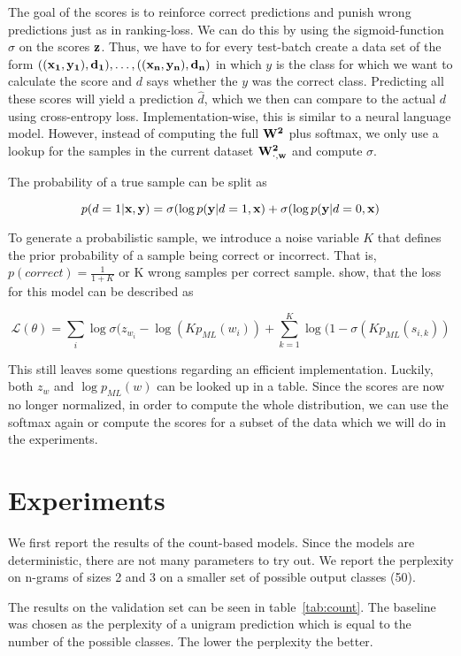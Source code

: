 \documentclass[11pt]{article}
\begin{document}
The goal of the scores is to reinforce correct predictions and punish wrong predictions just as in ranking-loss. We can do this by using the sigmoid-function $\sigma$ on the scores $\bf z$. Thus, we have to for every test-batch create a data set of the form $((\bf x_1, y_1), d_1), \ldots, ((\bf x_n, y_n), d_n)$ in which $y$ is the class for which we want to calculate the score and $d$ says whether the $y$ was the correct class. Predicting all these scores will yield a prediction $\hat d$, which we then can compare to the actual $d$ using cross-entropy loss.
Implementation-wise, this is similar to a neural language model. However, instead of computing the full $\bf W^2$ plus softmax, we only use a lookup for the samples in the current dataset $\bf W^2_{\cdot, w}$ and compute $\sigma$. 

The probability of a true sample can be split as 

$$p(d=1|\textbf {x}, \textbf y) = \sigma(\log p(\textbf y|d=1, \textbf x) + \sigma(\log p(\textbf y|d=0, \textbf x)$$

To generate a probabilistic sample, we introduce a noise variable $K$ that defines the prior probability of a sample being correct or incorrect. That is, $p(correct) = \frac{1}{1+K}$ or K wrong samples per correct sample.
\citet{mnih2012fast} show, that the loss for this model can be described as 

$$\mathcal{L}(\theta) = \sum_i \log \sigma(z_{w_i} - \log(Kp_{ML}(w_i)) + \sum_{k=1}^K \log(1-\sigma(Kp_{ML}(s_{i,k}))$$

This still leaves some questions regarding an efficient implementation. Luckily, both $z_w$ and $\log p_{ML}(w)$ can be looked up in a table. Since the scores are now no longer normalized, in order to compute the whole distribution, we can use the softmax again or compute the scores for a subset of the data which we will do in the experiments. 

\section{Experiments}

We first report the results of the count-based models. Since the models are deterministic, there are not many parameters to try out. We report the perplexity on n-grams of sizes 2 and 3 on a smaller set of possible output classes (50).

The results on the validation set can be seen in table~\ref{tab:count}. The baseline was chosen as the perplexity of a unigram prediction which is equal to the number of the possible classes. The lower the perplexity the better.
\end{document}
